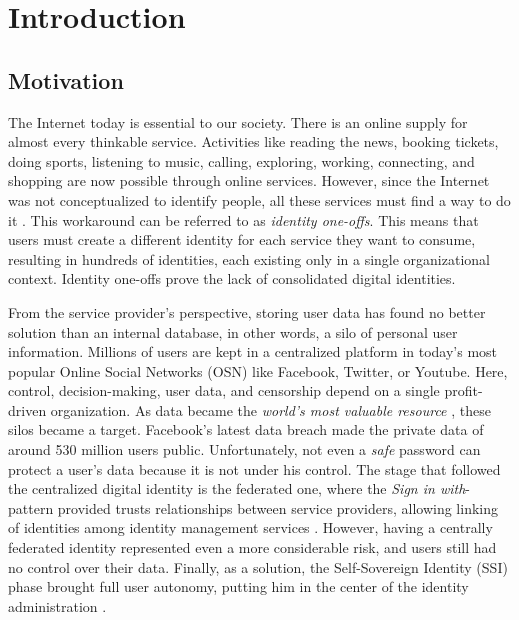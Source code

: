 \chapter{Introduction}
\label{cha:introduction}

\section{Motivation}

The Internet today is essential to our society. There is an online supply for almost every thinkable service. Activities like reading the news, booking tickets, doing sports, listening to music, calling, exploring, working, connecting, and shopping are now possible through online services. However, since the Internet was not conceptualized to identify people, all these services must find a way to do it \cite{Tobin_Reed_Windley_Foundation_2017}. This workaround can be referred to as \emph{identity one-offs}. This means that users must create a different identity for each service they want to consume, resulting in hundreds of identities, each existing only in a single organizational context. Identity one-offs prove the lack of consolidated digital identities\cite{macinnis_2019}.

From the service provider's perspective, storing user data has found no better solution than an internal database, in other words,  a silo of personal user information. Millions of users are kept in a centralized platform in today's most popular Online Social Networks (OSN) like Facebook, Twitter, or Youtube. Here, control, decision-making, user data, and censorship depend on a single profit-driven organization. As data became the \emph{world's most valuable resource} \cite{parkins_2017}, these silos became a target. Facebook's latest data breach made the private data of around 530 million users public\cite{holmes_2021}. Unfortunately, not even a \emph{safe} password can protect a user's data because it is not under his control. The stage that followed the centralized digital identity is the federated one, where the \emph{Sign in with}-pattern provided trusts relationships between service providers, allowing linking of identities among identity management services \cite{1556498}. However, having a centrally federated identity represented even a more considerable risk, and users still had no control over their data. Finally, as a solution, the Self-Sovereign Identity (SSI) phase brought full user autonomy, putting him in the center of the identity administration \cite{allen_2016}.  

